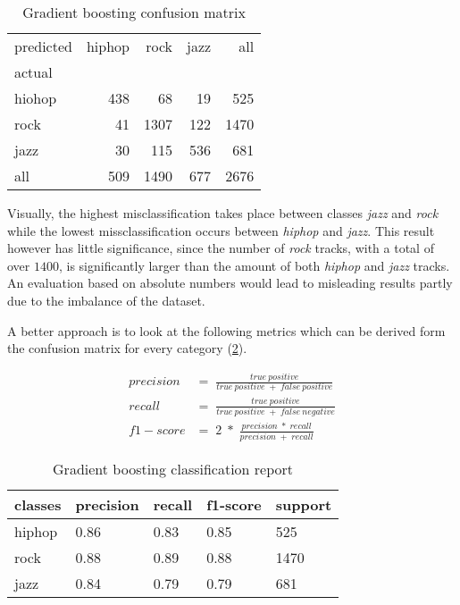 \begin{table}[H]
  \centering
  \begin{tabular}{lrrrr}
    \toprule
    predicted & hiphop & rock & jazz &   all \\
    actual &      &       &      &       \\
    \midrule
    hiohop &  438 &    68 &   19 &   525 \\
    rock   &   41 &  1307 &  122 &  1470 \\
    jazz   &   30 &   115 &  536 &   681 \\
    all    &  509 &  1490 &  677 &  2676 \\
    \bottomrule
    \end{tabular}
  \caption{Gradient boosting confusion matrix}%
  \label{tbl:gb_confusion_matrix}%
\end{table} 

Visually, the highest misclassification takes place between classes \emph{jazz} and \emph{rock} while the lowest missclassification occurs
between \emph{hiphop} and \emph{jazz}. This result however has little significance, since the number of \emph{rock} tracks, with a total of over 
\(1400\), is significantly larger than the amount of both \emph{hiphop} and \emph{jazz} tracks. An evaluation based on absolute numbers would lead to 
misleading results partly due to the imbalance of the dataset. 

A better approach is to look at the following metrics which can be derived form the confusion matrix for every category \cite[p.235]{Davis_2006} \cite[p.862]{fawcett2006introduction}(\ref{tbl:gb_classification_Report}). 

\begin{equation*}
  \begin{aligned}
    precision &= \;\frac{true\:positive}{true\:positive\;+\;false\:positive}
    \\
    recall &= \;\frac{true\:positive}{true\:positive\;+\;false\:negative}
    \\
    f1-score &= \;2\;*\;\frac{precision\;*\;recall}{precision\;+\;recall}
  \end{aligned}
\end{equation*}

\begin{table}[H]
  \centering
  \begin{tabular}{lllll}
    \toprule
    classes & precision & recall & f1-score & support \\
    \midrule
     hiphop &      0.86 &   0.83 &     0.85 &     525 \\
       rock &      0.88 &   0.89 &     0.88 &    1470 \\
       jazz &      0.84 &   0.79 &     0.79 &     681 \\
    \bottomrule
    \end{tabular}
  \caption{Gradient boosting classification report}%
  \label{tbl:gb_classification_Report}%
\end{table} 

